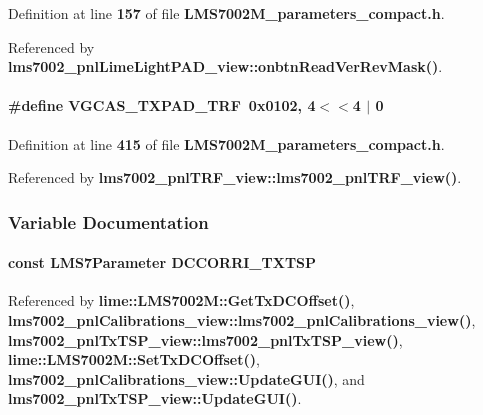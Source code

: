 Definition at line {\bf 157} of file {\bf L\+M\+S7002\+M\+\_\+parameters\+\_\+compact.\+h}.



Referenced by {\bf lms7002\+\_\+pnl\+Lime\+Light\+P\+A\+D\+\_\+view\+::onbtn\+Read\+Ver\+Rev\+Mask()}.

\paragraph[{V\+G\+C\+A\+S\+\_\+\+T\+X\+P\+A\+D\+\_\+\+T\+RF}]{\setlength{\rightskip}{0pt plus 5cm}\#define V\+G\+C\+A\+S\+\_\+\+T\+X\+P\+A\+D\+\_\+\+T\+RF~0x0102, 4$<$$<$4 $\vert$  0}\label{LMS7002M__parameters__compact_8h_ad908c132d94f4b3b0713ad4e3edae69c}


Definition at line {\bf 415} of file {\bf L\+M\+S7002\+M\+\_\+parameters\+\_\+compact.\+h}.



Referenced by {\bf lms7002\+\_\+pnl\+T\+R\+F\+\_\+view\+::lms7002\+\_\+pnl\+T\+R\+F\+\_\+view()}.



\subsubsection{Variable Documentation}
\paragraph[{D\+C\+C\+O\+R\+R\+I\+\_\+\+T\+X\+T\+SP}]{\setlength{\rightskip}{0pt plus 5cm}const {\bf L\+M\+S7\+Parameter} D\+C\+C\+O\+R\+R\+I\+\_\+\+T\+X\+T\+SP}\label{LMS7002M__parameters__compact_8h_a5a5845eb398bdfe33e367c78e3d6cbe2}


Referenced by {\bf lime\+::\+L\+M\+S7002\+M\+::\+Get\+Tx\+D\+C\+Offset()}, {\bf lms7002\+\_\+pnl\+Calibrations\+\_\+view\+::lms7002\+\_\+pnl\+Calibrations\+\_\+view()}, {\bf lms7002\+\_\+pnl\+Tx\+T\+S\+P\+\_\+view\+::lms7002\+\_\+pnl\+Tx\+T\+S\+P\+\_\+view()}, {\bf lime\+::\+L\+M\+S7002\+M\+::\+Set\+Tx\+D\+C\+Offset()}, {\bf lms7002\+\_\+pnl\+Calibrations\+\_\+view\+::\+Update\+G\+U\+I()}, and {\bf lms7002\+\_\+pnl\+Tx\+T\+S\+P\+\_\+view\+::\+Update\+G\+U\+I()}.

